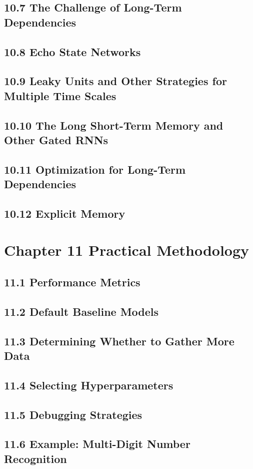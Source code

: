 \documentclass[a4paper]{report}
\begin{document}
\subsection{10.7 The Challenge of Long-Term Dependencies}
\subsection{10.8 Echo State Networks}
\subsection{10.9 Leaky Units and Other Strategies for Multiple Time Scales}
\subsection{10.10 The Long Short-Term Memory and Other Gated RNNs}
\subsection{10.11 Optimization for Long-Term Dependencies}
\subsection{10.12 Explicit Memory}

\section{Chapter 11 Practical Methodology}
\subsection{11.1 Performance Metrics}
\subsection{11.2 Default Baseline Models}
\subsection{11.3 Determining Whether to Gather More Data}
\subsection{11.4 Selecting Hyperparameters}
\subsection{11.5 Debugging Strategies}
\subsection{11.6 Example: Multi-Digit Number Recognition}
\end{document}
